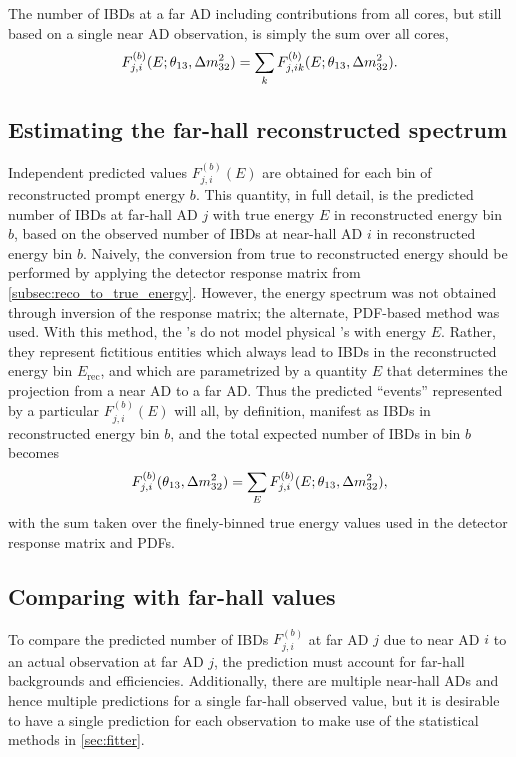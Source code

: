 The number of IBDs at a far AD including contributions from all cores,
but still based on a single near AD observation,
is simply the sum over all cores,
\begin{equation}
    F_{j,i}^{(b)}(E;\theta_{13},\Delta m^2_{32}) = \sum_k F_{j,ik}^{(b)}(E;\theta_{13},\Delta m^2_{32}).
\end{equation}

\subsection{Estimating the far-hall reconstructed spectrum}
\label{subsec:true_to_reco_farhall}

Independent predicted values $F_{j,i}^{(b)}(E)$ are obtained
for each bin of reconstructed prompt energy $b$.
This quantity, in full detail,
is the predicted number of IBDs at far-hall AD $j$
with true \nuebar{} energy $E$ in reconstructed energy bin $b$,
based on the observed number of IBDs at near-hall AD $i$
in reconstructed energy bin $b$.
Naively, the conversion from true to reconstructed energy
should be performed by applying the detector response matrix
from \cref{subsec:reco_to_true_energy}.
However, the \nuebar{} energy spectrum was not obtained
through inversion of the response matrix;
the alternate, PDF-based method was used.
With this method, the \nuebar{}'s do not model physical \nuebar{}'s with energy $E$.
Rather, they represent fictitious entities which always
lead to IBDs in the reconstructed energy bin $E_\text{rec}$,
and which are parametrized by a quantity $E$ that determines
the projection from a near AD to a far AD.
Thus the predicted ``events'' represented by a particular
$F_{j,i}^{(b)}(E)$ will all, by definition,
manifest as IBDs in reconstructed energy bin $b$,
and the total expected number of IBDs in bin $b$ becomes
\begin{equation}
    F_{j,i}^{(b)}(\theta_{13},\Delta m^2_{32}) = \sum_E F_{j,i}^{(b)}(E;\theta_{13},\Delta m^2_{32}),
\end{equation}
with the sum taken over the finely-binned true energy values
used in the detector response matrix and PDFs.

\subsection{Comparing with far-hall values}
\label{subsec:far_bg_eff}

To compare the predicted number of IBDs $F_{j,i}^{(b)}$
at far AD $j$ due to near AD $i$
to an actual observation at far AD $j$,
the prediction must account for far-hall backgrounds and efficiencies.
Additionally, there are multiple near-hall ADs
and hence multiple predictions for a single far-hall observed value,
but it is desirable to have a single prediction for each observation
to make use of the statistical methods in \cref{sec:fitter}.


